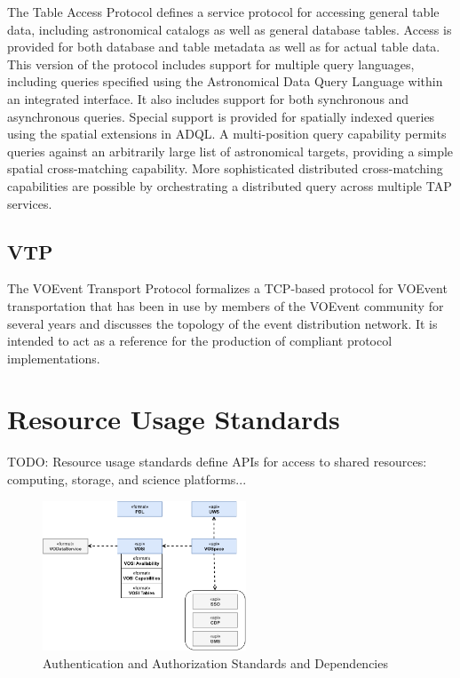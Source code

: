 \documentclass[11pt,a4paper]{ivoa}
\begin{document}
The Table Access Protocol defines a service protocol for accessing general table data, 
including astronomical catalogs as well as general database tables. Access is provided 
for both database and table metadata as well as for actual table data. This version of 
the protocol includes support for multiple query languages, including queries specified 
using the Astronomical Data Query Language within an integrated interface. It also 
includes support for both synchronous and asynchronous queries. Special support is 
provided for spatially indexed queries using the spatial extensions in ADQL. A multi-position 
query capability permits queries against an arbitrarily large list of astronomical targets, 
providing a simple spatial cross-matching capability. More sophisticated distributed 
cross-matching capabilities are possible by orchestrating a distributed query across 
multiple TAP services. 

\subsection{VTP}

The VOEvent Transport Protocol formalizes a TCP-based protocol for VOEvent transportation 
that has been in use by members of the VOEvent community for several years and discusses 
the topology of the event distribution network. It is intended to act as a reference for 
the production of compliant protocol implementations. 

\section{Resource Usage Standards}

TODO: Resource usage standards define APIs for access to shared resources: computing, storage, 
and science platforms...

\begin{figure}[h]
\centering
\includegraphics[width=0.54\textwidth]{ivoa-arch-gws.pdf}
\caption{Authentication and Authorization Standards and Dependencies}
\label{fig:gwsdeps}
\end{figure}
\end{document}
